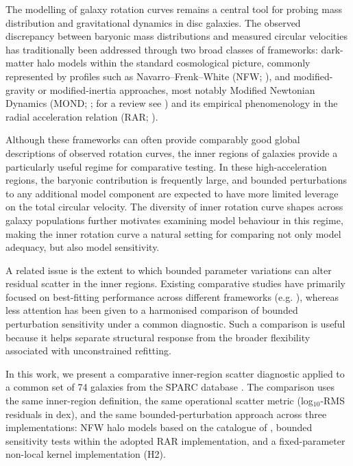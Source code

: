 \documentclass[fleqn,usenatbib]{mnras}
\begin{document}
The modelling of galaxy rotation curves remains a central tool 
for probing mass distribution and gravitational dynamics in disc 
galaxies. The observed discrepancy between baryonic mass 
distributions and measured circular velocities has traditionally 
been addressed through two broad classes of frameworks: dark-matter 
halo models within the standard cosmological picture, commonly 
represented by profiles such as Navarro--Frenk--White (NFW; 
\citealt{Navarro1997}), and modified-gravity or modified-inertia 
approaches, most notably Modified Newtonian Dynamics (MOND; 
\citealt{Milgrom1983}; for a review see \citealt{Famaey2012}) 
and its empirical phenomenology in the radial acceleration 
relation (RAR; \citealt{McGaugh2016, Lelli2017}).

Although these frameworks can often provide comparably good global 
descriptions of observed rotation curves, the inner regions of 
galaxies provide a particularly useful regime for comparative 
testing. In these high-acceleration regions, the baryonic 
contribution is frequently large, and bounded perturbations to 
any additional model component are expected to have more limited 
leverage on the total circular velocity. The diversity of 
inner rotation curve shapes across galaxy populations 
\citep{deBlok2010, Oman2015} further motivates examining model 
behaviour in this regime, making the inner rotation curve a 
natural setting for comparing not only model adequacy, but also 
model sensitivity.

A related issue is the extent to which bounded parameter variations 
can alter residual scatter in the inner regions. Existing comparative 
studies have primarily focused on best-fitting performance across 
different frameworks (e.g. \citealt{Lelli2016, Li2018, Li2020}), whereas 
less attention has been given to a harmonised comparison of bounded 
perturbation sensitivity under a common diagnostic. Such a comparison 
is useful because it helps separate structural response from the 
broader flexibility associated with unconstrained refitting.

In this work, we present a comparative inner-region scatter 
diagnostic applied to a common set of 74 galaxies from the SPARC 
database \citep{Lelli2016}. The comparison uses the same inner-region 
definition, the same operational scatter metric (log$_{10}$-RMS 
residuals in dex), and the same bounded-perturbation approach across 
three implementations: NFW halo models based on the catalogue of 
\citet{Li2020}, bounded sensitivity tests within the adopted RAR 
implementation, and a fixed-parameter non-local kernel implementation (H2).
\end{document}
